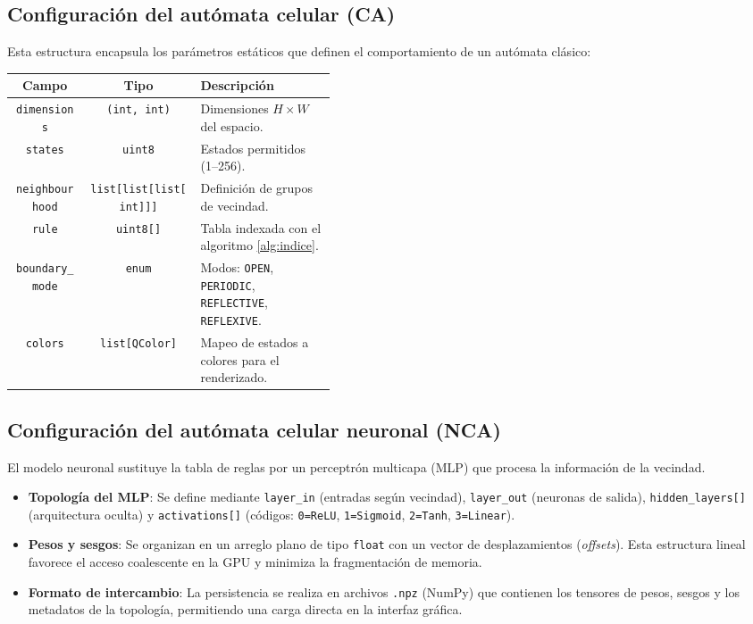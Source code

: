 \subsection{Configuración del autómata celular (CA)}

Esta estructura encapsula los parámetros estáticos que definen el comportamiento de un autómata clásico:

\begin{center}
	\begin{tabular}{c|c | p{0.42\linewidth}}
		\hline
		\textbf{Campo} & \textbf{Tipo} & \textbf{Descripción} \\
		\hline 
		\texttt{dimensions} & \texttt{(int, int)} & Dimensiones $H \times W$ del espacio. \\ \hline 
		\texttt{states} & \texttt{uint8} & Estados permitidos (1--256). \\ \hline 
		\texttt{neighbourhood} & \texttt{list[list[list[int]]]} & Definición de grupos de vecindad. \\ \hline 
		\texttt{rule} & \texttt{uint8[]} & Tabla indexada con el algoritmo \ref{alg:indice}. \\ \hline 
		\texttt{boundary\_mode} & \texttt{enum} & Modos: \texttt{OPEN}, \texttt{PERIODIC}, \texttt{REFLECTIVE}, \texttt{REFLEXIVE}. \\ \hline 
		\texttt{colors} & \texttt{list[QColor]} & Mapeo de estados a colores para el renderizado. \\
	\end{tabular}
\end{center}

\subsection{Configuración del autómata celular neuronal (NCA)}

El modelo neuronal sustituye la tabla de reglas por un perceptrón multicapa (MLP) que procesa la información de la vecindad.

\begin{itemize}
	\item \textbf{Topología del MLP}: Se define mediante \texttt{layer\_in} (entradas según vecindad), \texttt{layer\_out} (neuronas de salida), \texttt{hidden\_layers[]} (arquitectura oculta) y \texttt{activations[]} (códigos: \texttt{0=ReLU}, \texttt{1=Sigmoid}, \texttt{2=Tanh}, \texttt{3=Linear}).
	
	\item \textbf{Pesos y sesgos}: Se organizan en un arreglo plano de tipo \texttt{float} con un vector de desplazamientos (\textit{offsets}). Esta estructura lineal favorece el acceso coalescente en la GPU y minimiza la fragmentación de memoria.
	
	\item \textbf{Formato de intercambio}: La persistencia se realiza en archivos \texttt{.npz} (NumPy) que contienen los tensores de pesos, sesgos y los metadatos de la topología, permitiendo una carga directa en la interfaz gráfica.
\end{itemize}

